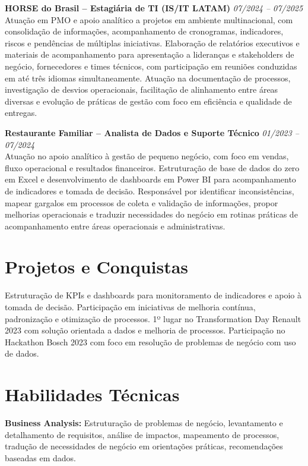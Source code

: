 \documentclass[11pt,a4paper]{article}
\newcommand{\experience}[3]{%
  \textbf{#1} \hfill \textit{#2}\\[4pt]
  #3
  \vspace{8pt}
}
\begin{document}
\experience{HORSE do Brasil -- Estagiária de TI (IS/IT LATAM)}{07/2024 -- 07/2025}{%
Atuação em PMO e apoio analítico a projetos em ambiente multinacional, com consolidação de informações, acompanhamento de cronogramas, indicadores, riscos e pendências de múltiplas iniciativas. Elaboração de relatórios executivos e materiais de acompanhamento para apresentação a lideranças e stakeholders de negócio, fornecedores e times técnicos, com participação em reuniões conduzidas em até três idiomas simultaneamente. Atuação na documentação de processos, investigação de desvios operacionais, facilitação de alinhamento entre áreas diversas e evolução de práticas de gestão com foco em eficiência e qualidade de entregas.}

\experience{Restaurante Familiar -- Analista de Dados e Suporte Técnico}{01/2023 -- 07/2024}{%
Atuação no apoio analítico à gestão de pequeno negócio, com foco em vendas, fluxo operacional e resultados financeiros. Estruturação de base de dados do zero em Excel e desenvolvimento de dashboards em Power BI para acompanhamento de indicadores e tomada de decisão. Responsável por identificar inconsistências, mapear gargalos em processos de coleta e validação de informações, propor melhorias operacionais e traduzir necessidades do negócio em rotinas práticas de acompanhamento entre áreas operacionais e administrativas.}

\section*{Projetos e Conquistas}

Estruturação de KPIs e dashboards para monitoramento de indicadores e apoio à tomada de decisão. Participação em iniciativas de melhoria contínua, padronização e otimização de processos. 1º lugar no Transformation Day Renault 2023 com solução orientada a dados e melhoria de processos. Participação no Hackathon Bosch 2023 com foco em resolução de problemas de negócio com uso de dados.

\section*{Habilidades Técnicas}

\textbf{Business Analysis:} Estruturação de problemas de negócio, levantamento e detalhamento de requisitos, análise de impactos, mapeamento de processos, tradução de necessidades de negócio em orientações práticas, recomendações baseadas em dados.
\end{document}
